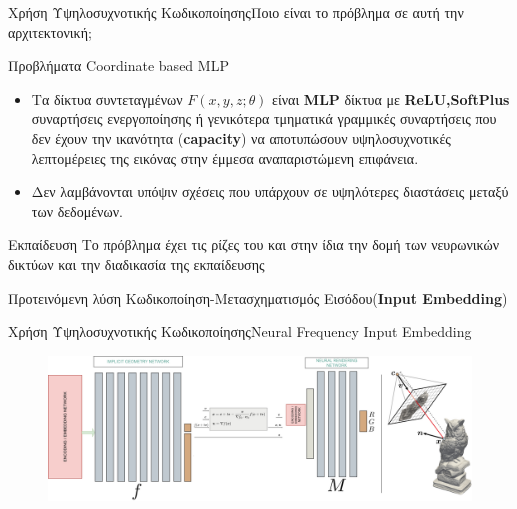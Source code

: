 \documentclass[10pt]{beamer}
\begin{document}
\begin{frame}{Χρήση Υψηλοσυχνοτικής Κωδικοποίησης}{Ποιο είναι το πρόβλημα σε αυτή την αρχιτεκτονική;}
        \begin{block}{Προβλήματα Coordinate based MLP}
            \begin{itemize}
            \item Τα δίκτυα συντεταγμένων \(F(x,y,z;\theta)\) είναι \textbf{MLP} δίκτυα με \textbf{ReLU,SoftPlus} συναρτήσεις ενεργοποίησης ή γενικότερα τμηματικά γραμμικές συναρτήσεις που δεν έχουν την ικανότητα (\textbf{capacity}) να αποτυπώσουν υψηλοσυχνοτικές λεπτομέρειες της εικόνας στην έμμεσα αναπαριστώμενη επιφάνεια.
            \item Δεν λαμβάνονται υπόψιν σχέσεις που υπάρχουν σε υψηλότερες  διαστάσεις μεταξύ των δεδομένων.
            \end{itemize}
        \end{block} \pause
        \begin{alertblock}{Εκπαίδευση}
             Το πρόβλημα έχει τις ρίζες του και στην ίδια την δομή των νευρωνικών δικτύων και την διαδικασία της εκπαίδευσης
        \end{alertblock}\pause
        \begin{exampleblock}{Προτεινόμενη λύση} 
            Κωδικοποίηση-Μετασχηματισμός Εισόδου(\textbf{Input Εmbedding})
        \end{exampleblock}
        
\end{frame}
\begin{frame}{Χρήση Υψηλοσυχνοτικής Κωδικοποίησης}{Neural Frequency Input Embedding}
    \begin{figure}
        \centering
        \includegraphics[height=.4\textheight,width=\textwidth]{images/IDRwithEncoding.jpg}
    \end{figure}
\end{frame}
\end{document}
